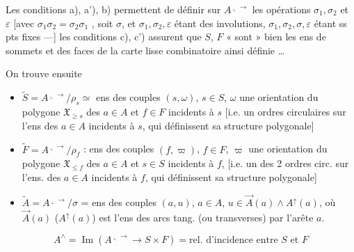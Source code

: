 \documentclass[11pt,a4paper]{article}
\begin{document}
Les conditions a), a'), b) permettent de définir sur $A^{\llcorner\!\to}$ les
opérations $\sigma_1, \sigma_2$ et $\varepsilon$ [avec
$\sigma_1\sigma_2 = \sigma_2\sigma_1$ \struck{\ill{}}, soit $\sigma$, et
$\sigma_1, \sigma_2, \varepsilon$ étant des involutions,
$\sigma_1, \sigma_2, \sigma, \varepsilon$ étant ss pts fixes —] les conditions
c), c') assurent que $S$, $F$ « sont » bien les ens de sommets et des faces de
la carte lisse combinatoire ainsi définie …


On trouve ensuite
\begin{itemize}
  \item[] $\widetilde{S} = A^{\llcorner\!\to}/\rho_s \simeq$ ens des couples
    $(s,\omega)$, $s \in S$, $\omega$ une orientation du \struck{\ill{}}
    polygone $\mathfrak{X}_{\geq s}$ des $a \in A$ et $f \in F$ incidents à
    $s$ [i.e. un  ordres circulaires sur l'ens des $a \in A$
    incidents à $s$, qui définissent sa structure polygonale]
  \item[] $\widetilde{F} = A^{\llcorner\!\to}/\rho_f$ : ens des couples
    $(f,\varpi)$, $f \in F$, $\varpi$ une orientation du polygone
    $\mathfrak{X}_{\leq f}$ des \struck{\ill{}} $a \in A$ et $s \in S$
    incidents à $f$, [i.e. un des 2 ordres circ. sur l'ens. des $a \in A$
    incidents à $f$, qui définissent sa structure polygonale]
  \item[] $\widetilde{A} = A^{\llcorner\!\to}/\sigma$ = ens des couples
    $(a,u)$, $a \in A$, $u \in \vec{A}(a) \wedge A^{\uparrow}(a)$, où
    $\vec{A}(a)$ ($A^{\uparrow}(a)$) est l'ens des arcs tang. (ou
    transverses)  par l'arête $a$.
\end{itemize}

\[
  A^{\wedge} = \operatorname{Im}(A^{\llcorner\!\to} \to S \times F)
  = \text{rel. d'incidence entre $S$ et $F$}
\]


\end{document}
